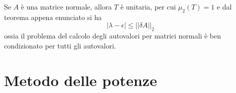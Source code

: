 \begin{observation}
Se $A$ \`e una matrice normale, allora $T$
\`e unitaria, per cui $\mu_2 (T) = 1$ e dal teorema appena enunciato
si ha
$$|\lambda − \epsilon| \leq || \delta A||_2$$
ossia il problema del calcolo degli autovalori per matrici normali \`e
 ben condizionato per tutti gli autovalori.
\end{observation}

\section{Metodo delle potenze}

